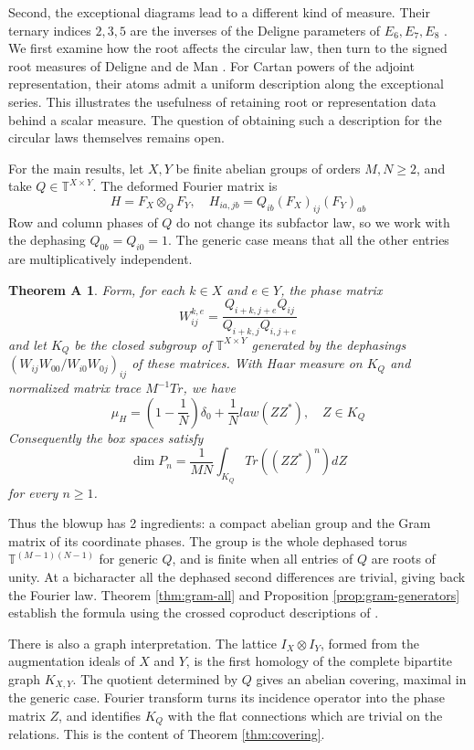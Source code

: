 \documentclass[11pt,reqno]{amsart}
\newtheorem*{thmA}{Theorem A}
\theoremstyle{definition}
\numberwithin{equation}{section}
\begin{document}
Second, the exceptional diagrams lead to a different kind of measure. Their ternary indices $2,3,5$ are the inverses of the Deligne parameters of $E_6,E_7,E_8$ \cite{Del96}. We first examine how the root affects the circular law, then turn to the signed root measures of Deligne and de Man \cite{DDM96}. For Cartan powers of the adjoint representation, their atoms admit a uniform description along the exceptional series. This illustrates the usefulness of retaining root or representation data behind a scalar measure. The question of obtaining such a description for the circular laws themselves remains open.

For the main results, let $X,Y$ be finite abelian groups of orders $M,N\geq2$, and take $Q\in\mathbb T^{X\times Y}$. The deformed Fourier matrix is
$$H=F_X\otimes_QF_Y,\quad H_{ia,jb}=Q_{ib}(F_X)_{ij}(F_Y)_{ab}$$
Row and column phases of $Q$ do not change its subfactor law, so we work with the dephasing $Q_{0b}=Q_{i0}=1$. The generic case means that all the other entries are multiplicatively independent.

\begin{thmA}
Form, for each $k\in X$ and $e\in Y$, the phase matrix
$$W^{k,e}_{ij}=\frac{Q_{i+k,j+e}Q_{ij}}{Q_{i+k,j}Q_{i,j+e}}$$
and let $K_Q$ be the closed subgroup of $\mathbb T^{X\times Y}$ generated by the dephasings $(W_{ij}W_{00}/W_{i0}W_{0j})_{ij}$ of these matrices. With Haar measure on $K_Q$ and normalized matrix trace $M^{-1}Tr$, we have
$$\mu_H=\left(1-\frac1N\right)\delta_0+\frac1N law(ZZ^*),\quad Z\in K_Q$$
Consequently the box spaces satisfy
$$\dim P_n=\frac1{MN}\int_{K_Q}Tr((ZZ^*)^n)dZ$$
for every $n\geq1$.
\end{thmA}

Thus the blowup has 2 ingredients: a compact abelian group and the Gram matrix of its coordinate phases. The group is the whole dephased torus $\mathbb T^{(M-1)(N-1)}$ for generic $Q$, and is finite when all entries of $Q$ are roots of unity. At a bicharacter all the dephased second differences are trivial, giving back the Fourier law. Theorem \ref{thm:gram-all} and Proposition \ref{prop:gram-generators} establish the formula using the crossed coproduct descriptions of \cite{BBi15,Bic15,BO26}.

There is also a graph interpretation. The lattice $I_X\otimes I_Y$, formed from the augmentation ideals of $X$ and $Y$, is the first homology of the complete bipartite graph $K_{X,Y}$. The quotient determined by $Q$ gives an abelian covering, maximal in the generic case. Fourier transform turns its incidence operator into the phase matrix $Z$, and identifies $K_Q$ with the flat connections which are trivial on the relations. This is the content of Theorem \ref{thm:covering}.
\end{document}
